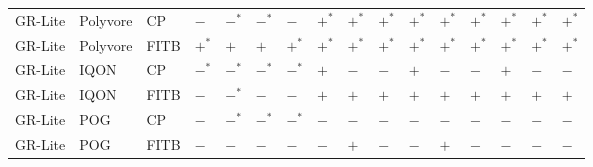 \begin{table}[htbp]
\begin{adjustbox}{max width=\linewidth}
\begin{tabular}{llllllllllllllll}
GR-Lite & Polyvore & CP & $-$ & $-^{*}$ & $-^{*}$ & $-$ & $+^{*}$ & $+^{*}$ & $+^{*}$ & $+^{*}$ & $+^{*}$ & $+^{*}$ & $+^{*}$ & $+^{*}$ & $+^{*}$\\
GR-Lite & Polyvore & FITB & $+^{*}$ & $+$ & $+$ & $+^{*}$ & $+^{*}$ & $+^{*}$ & $+^{*}$ & $+^{*}$ & $+^{*}$ & $+^{*}$ & $+^{*}$ & $+^{*}$ & $+^{*}$\\
GR-Lite & IQON & CP & $-^{*}$ & $-^{*}$ & $-^{*}$ & $-^{*}$ & $+$ & $-$ & $-$ & $+$ & $-$ & $-$ & $+$ & $-$ & $-$\\
GR-Lite & IQON & FITB & $-$ & $-^{*}$ & $-$ & $-$ & $+$ & $+$ & $+$ & $+$ & $+$ & $+$ & $+$ & $+$ & $+$\\
GR-Lite & POG & CP & $-$ & $-^{*}$ & $-^{*}$ & $-^{*}$ & $-$ & $-$ & $-$ & $-$ & $-$ & $-$ & $-$ & $-$ & $-$\\
GR-Lite & POG & FITB & $-$ & $-$ & $-$ & $-$ & $-$ & $+$ & $-$ & $-$ & $+$ & $-$ & $-$ & $-$ & $-$\\
\bottomrule\end{tabular}\end{adjustbox}\end{table}
